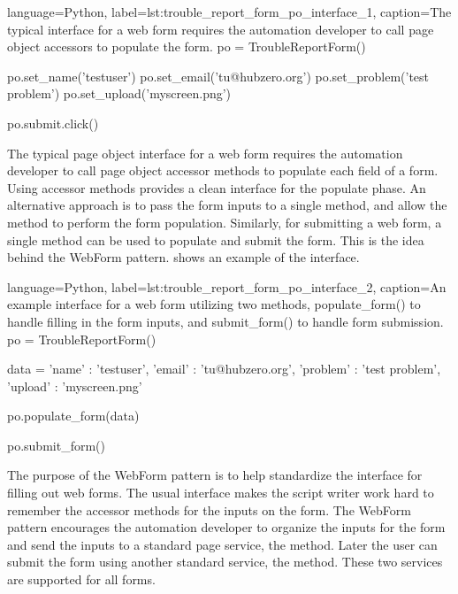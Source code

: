 \begin{xcode}{%
  language=Python,%
  label=lst:trouble_report_form_po_interface_1,%
  caption={The typical interface for a web form requires the automation %
           developer to call page object accessors to populate the form.}%
}
po = TroubleReportForm()

po.set_name('testuser')
po.set_email('tu@hubzero.org')
po.set_problem('test problem')
po.set_upload('myscreen.png')

po.submit.click()
\end{xcode}

The typical page object interface for a web form requires the automation
developer to call page object accessor methods to populate each field of a
form. Using accessor methods provides a clean interface for the populate phase.
An alternative approach is to pass the form inputs to a single method, and
allow the method to perform the form population. Similarly, for submitting a
web form, a single method can be used to populate and submit the form. This is
the idea behind the WebForm pattern.
 shows an example of the interface.


\begin{xcode}{%
  language=Python,%
  label=lst:trouble_report_form_po_interface_2,%
  caption={An example interface for a web form utilizing two methods, %
           populate\_form() to handle filling in the form inputs, %
           and submit\_form() to handle form submission.}%
}
po = TroubleReportForm()

data = {
  'name'    : 'testuser',
  'email'   : 'tu@hubzero.org',
  'problem' : 'test problem',
  'upload'  : 'myscreen.png'
}

po.populate_form(data)

po.submit_form()
\end{xcode}


The purpose of the WebForm pattern is to help standardize the interface for
filling out web forms.  The usual interface makes the script writer work hard
to remember the accessor methods for the inputs on the form. The WebForm
pattern encourages the automation developer to organize the inputs for the form
and send the inputs to a standard page service, the 
method. Later the user can submit the form using another standard service, the
 method. These two services are supported for all
forms.

